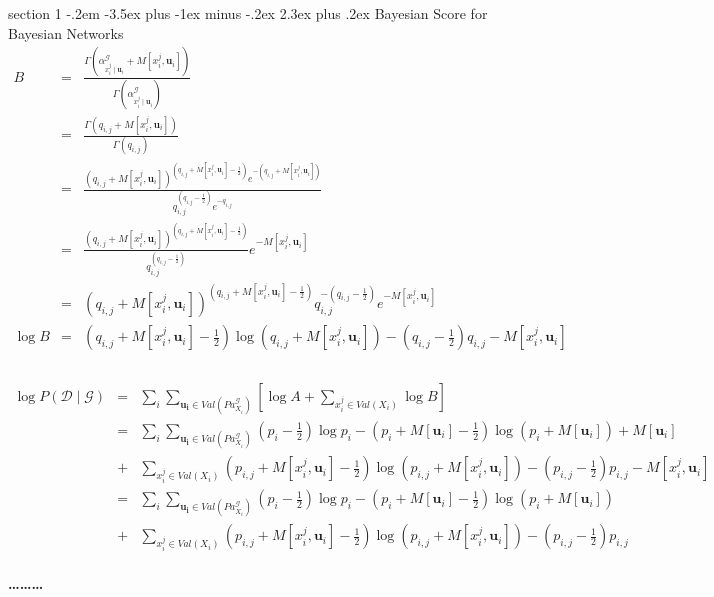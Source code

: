 \documentclass[12pt]{article}
\makeatletter
\newenvironment{problem}{\@startsection
       {section}
       {1}
       {-.2em}
       {-3.5ex plus -1ex minus -.2ex}
       {2.3ex plus .2ex}
       {\pagebreak[3]%
       \large\bf\noindent{Problem }
       }
       }
       {%
       \begin{center}\large\bf \ldots\ldots\ldots\end{center}}
\makeatother
\begin{document}
\begin{problem}{Bayesian Score for Bayesian Networks}
\begin{eqnarray*}
B & = & \frac{\Gamma(\alpha^{\mathcal{G}}_{x_{i}^{j}\mid \mathbf{u}_{i}} + M[ x_{i}^{j},\mathbf{u}_{i}])}{\Gamma(\alpha^{\mathcal{G}}_{x_{i}^{j}\mid \mathbf{u}_{i}} )}\\
& = & \frac{\Gamma(q_{i,j}  + M[ x_{i}^{j},\mathbf{u}_{i}])}{\Gamma(q_{i,j} )}\\
& = & \frac{(q_{i,j}  + M[ x_{i}^{j},\mathbf{u}_{i}])^{(q_{i,j}  + M[ x_{i}^{j},\mathbf{u}_{i}] -\frac{1}{2})}e^{-(q_{i,j}  + M[ x_{i}^{j},\mathbf{u}_{i}])}}{q_{i,j} ^{(q_{i,j} -\frac{1}{2})} e^{-q_{i,j} }}\\
& = & \frac{(q_{i,j}  + M[ x_{i}^{j},\mathbf{u}_{i}])^{(q_{i,j}  + M[ x_{i}^{j},\mathbf{u}_{i}] -\frac{1}{2})}}{q_{i,j} ^{(q_{i,j} -\frac{1}{2})} } 
	e^{-M[ x_{i}^{j},\mathbf{u}_{i}]}\\
& = & (q_{i,j}  + M[ x_{i}^{j},\mathbf{u}_{i}])^{(q_{i,j}  + M[ x_{i}^{j},\mathbf{u}_{i}] -\frac{1}{2})}
	q_{i,j} ^{-(q_{i,j} -\frac{1}{2})} 
	e^{-M[ x_{i}^{j},\mathbf{u}_{i}]}\\
\log B & = & {(q_{i,j}  + M[ x_{i}^{j},\mathbf{u}_{i}] -\frac{1}{2})} \log (q_{i,j}  + M[ x_{i}^{j},\mathbf{u}_{i}])
	-(q_{i,j} -\frac{1}{2}) q_{i,j} 
	-M[ x_{i}^{j},\mathbf{u}_{i}]\\
\end{eqnarray*}
\\
\begin{eqnarray*}
\log P( \mathcal{D} \mid \mathcal{G}) & = & 
	\sum_{i} \sum_{\mathbf{u_{i}} \in Val(Pa^{\mathcal{G}}_{X_{i}})} 
	\left[ \log A + 
	\sum_{x_{i}^{j} \in Val(X_{i})} 
	\log B \right] \\
& = & 
	\sum_{i} \sum_{\mathbf{u_{i}} \in Val(Pa^{\mathcal{G}}_{X_{i}})} 
	(p_{i}-\frac{1}{2})\log p_{i}
	-(p_{i} + M[ \mathbf{u}_{i}] - \frac{1}{2})  \log (p_{i} + M[ \mathbf{u}_{i}])
	+ M[ \mathbf{u}_{i}]\\
	&+& \sum_{x_{i}^{j} \in Val(X_{i})} 
	{(p_{i,j}  + M[ x_{i}^{j},\mathbf{u}_{i}] -\frac{1}{2})} \log (p_{i,j}  + M[ x_{i}^{j},\mathbf{u}_{i}])
	-(p_{i,j} -\frac{1}{2}) p_{i,j} 
	-M[ x_{i}^{j},\mathbf{u}_{i}]\\
& = & 
	\sum_{i} \sum_{\mathbf{u_{i}} \in Val(Pa^{\mathcal{G}}_{X_{i}})} 
	(p_{i}-\frac{1}{2})\log p_{i}
	-(p_{i} + M[ \mathbf{u}_{i}] - \frac{1}{2})  \log (p_{i} + M[ \mathbf{u}_{i}])\\
	&+& \sum_{x_{i}^{j} \in Val(X_{i})} 
	{(p_{i,j}  + M[ x_{i}^{j},\mathbf{u}_{i}] -\frac{1}{2})} \log (p_{i,j}  + M[ x_{i}^{j},\mathbf{u}_{i}])
	-(p_{i,j} -\frac{1}{2}) p_{i,j} \\
\end{eqnarray*}


\end{problem}
\end{document}
